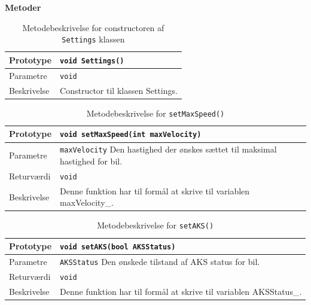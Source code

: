 \textbf{Metoder}

\begin{table}[h]
\begin{tabularx}{\textwidth}{| L{2.5 cm} | Z |} \hline
Prototype 	& \texttt{void Settings()} \\\hline
Parametre 	& \texttt{void} 		\newline \\\hline
Beskrivelse	& Constructor til klassen Settings. \newline \\\hline
\end{tabularx}
\caption{Metodebeskrivelse for constructoren af \texttt{Settings} klassen}
\label{table:met_settings}
\end{table}

\clearpage

\begin{table}[h]
\begin{tabularx}{\textwidth}{| L{2.5 cm} | Z |} \hline
Prototype 	& \texttt{void setMaxSpeed(int maxVelocity)} \\\hline
Parametre 	& \texttt{maxVelocity}		\newline Den hastighed der ønskes sættet til maksimal hastighed for bil.\\\hline
Returværdi	& \texttt{void} 			\newline \\\hline
Beskrivelse	& Denne funktion har til formål at skrive til variablen maxVelocity\_. \newline \\\hline
\end{tabularx}
\caption{Metodebeskrivelse for \texttt{setMaxSpeed()}}
\label{table:met_setmaxspeed}
\end{table}

\begin{table}[h]
\begin{tabularx}{\textwidth}{| L{2.5 cm} | Z |} \hline
Prototype 	& \texttt{void setAKS(bool AKSStatus)} \\\hline
Parametre 	& \texttt{AKSStatus}		\newline Den ønskede tilstand af AKS status for bil.\\\hline
Returværdi	& \texttt{void} 			\newline \\\hline
Beskrivelse	& Denne funktion har til formål at skrive til variablen AKSStatus\_.\newline \\\hline
\end{tabularx}
\caption{Metodebeskrivelse for \texttt{setAKS()}}
\label{table:met_setaks}
\end{table}

